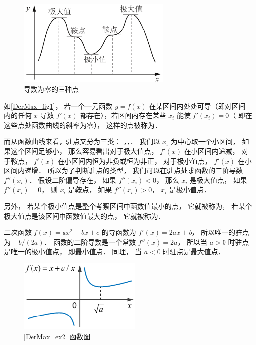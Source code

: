
\begin{figure}[ht]
\vskip-10pt
\centering
\includegraphics[width=7.5cm]{./figures/DerMax.pdf}
\caption{导数为零的三种点}\label{DerMax_fig1}
\end{figure}

如\autoref{DerMax_fig1}， 若一个一元函数 $y = f(x)$ 在某区间内处处可导（即对区间内的任何 $x$ 导数 $f'(x)$ 都存在），若区间内存在某些 $x_i$ 能使 $f'(x_i) = 0$（ 即在这些点处函数曲线的斜率为零）， 这样的点被称为．

而从函数曲线来看，驻点又分为三类： ，，． 我们以 $x_i$ 为中心取一个小区间， 如果这个区间足够小， 那么容易看出对于极大值点， $f'(x)$ 在小区间内递减， 对于鞍点， $f'(x)$ 在小区间内恒为非负或恒为非正， 对于极小值点， $f'(x)$ 在小区间内递增． 所以为了判断驻点的类型， 我们可以在驻点处求函数的二阶导数 $f''(x_i)$． 假设二阶偏导存在， 如果 $f''(x_i) < 0$， 那么 $x_i$ 是极大值点， 如果 $f''(x_i) = 0$， 则 $x_i$  是鞍点， 如果 $f''(x_i) > 0$， $x_i$ 是极小值点．

另外， 若某个极小值点是整个考察区间中函数值最小的点， 它就被称为， 若某个极大值点是该区间中函数值最大的点， 它就被称为．

\begin{exam}{}
二次函数 $f(x) = ax^2 + bx + c$ 的导函数为 $f'(x) = 2ax + b$， 所以唯一的驻点为 $-b/(2a)$． 函数的二阶导数是一个常数 $f''(x) = 2a$， 所以当 $a > 0$ 时驻点是唯一的极小值点， 即最小值点． 同理， 当 $a < 0$ 时驻点是最大值点．
\end{exam}

\begin{figure}[ht]
\centering
\includegraphics[width=6cm]{./figures/DerMax2.pdf}
\caption{\autoref{DerMax_ex2} 函数图} \label{DerMax2}
\end{figure}

